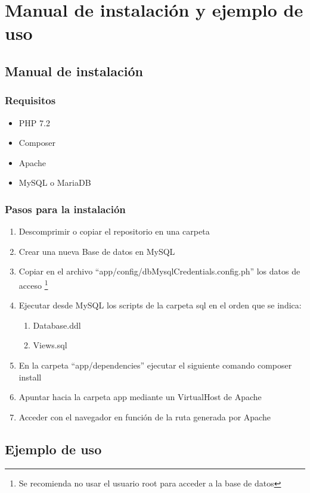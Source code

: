 
\chapter{Manual de instalación y ejemplo de uso}
\section{Manual de instalación}
\subsection{Requisitos}
\begin{itemize}
    \item PHP 7.2
    \item Composer \cite{Composer}
    \item Apache
    \item MySQL o MariaDB    
\end{itemize}

\subsection{Pasos para la instalación}
\begin{enumerate}
    \item Descomprimir o copiar el repositorio en una carpeta
    \item Crear una nueva Base de datos en MySQL
    \item Copiar en el archivo ``app/config/dbMysqlCredentials.config.ph'' los datos de acceso \footnote{Se recomienda no usar el usuario root para acceder a la base de datos}
    \item Ejecutar desde MySQL los scripts de la carpeta sql en el orden que se indica: 
        \begin{enumerate}
            \item Database.ddl
            \item Views.sql
        \end{enumerate}
    \item En la carpeta ``app/dependencies'' ejecutar el siguiente comando
    composer install
    \item Apuntar hacia la carpeta app mediante un VirtualHost de Apache
    \item Acceder con el navegador en función de la ruta generada por Apache 
\end{enumerate}

\section{Ejemplo de uso} \label{capturas}
